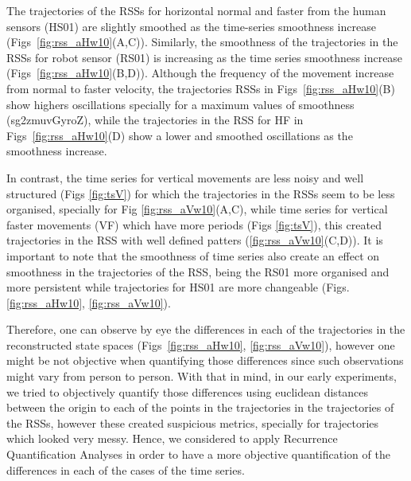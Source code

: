 The trajectories of the RSSs for horizontal normal and faster from the 
human sensors (HS01) are slightly smoothed as the time-series 
smoothness increase (Figs~\ref{fig:rss_aHw10}(A,C)). Similarly, 
the smoothness of the trajectories in the RSSs for robot sensor (RS01) 
is increasing as the time series smoothness increase 
(Figs~\ref{fig:rss_aHw10}(B,D)). 
Although the frequency of the movement increase from normal to faster velocity, 
the trajectories RSSs in Figs~\ref{fig:rss_aHw10}(B)
show highers oscillations specially for a maximum values of smoothness
(sg2zmuvGyroZ), while the trajectories in the RSS for HF in 
Figs~\ref{fig:rss_aHw10}(D) show a lower and smoothed oscillations 
as the smoothness increase.

In contrast, the time series for vertical movements are less noisy and 
well structured (Figs \ref{fig:tsV}) for which the trajectories in the RSSs 
seem to be less organised, specially for Fig \ref{fig:rss_aVw10}(A,C), 
while time series for vertical faster movements (VF) which have more 
periods (Figs \ref{fig:tsV}), this created trajectories in the RSS with 
well defined patters (\ref{fig:rss_aVw10}(C,D)).
It is important to note that the smoothness of time series also create 
an effect on smoothness in the trajectories of the RSS, being the RS01 
more organised and more persistent while trajectories for HS01 are 
more changeable (Figs. \ref{fig:rss_aHw10}, \ref{fig:rss_aVw10}).

Therefore, one can observe by eye the differences in each of the trajectories 
in the reconstructed state spaces 
(Figs~\ref{fig:rss_aHw10}, \ref{fig:rss_aVw10}), 
however one might be not objective when quantifying those differences 
since such observations might vary from person to person.
With that in mind, in our early experiments, we tried to objectively 
quantify those differences using euclidean distances between 
the origin to each of the points in the trajectories in the trajectories of 
the RSSs, however these created suspicious metrics, specially 
for trajectories which looked very messy.
Hence, we considered to apply Recurrence Quantification Analyses in order 
to have a more objective quantification of the differences in each of the 
cases of the time series.



